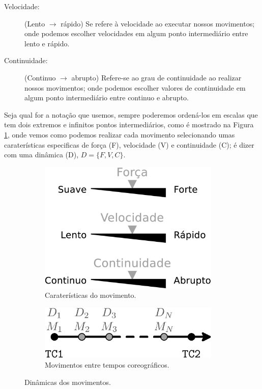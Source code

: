 \begin{description}
\item[Velocidade:] (Lento $\rightarrow$ rápido)
Se refere à velocidade ao executar nossos movimentos;
onde podemos escolher velocidades em algum ponto intermediário entre lento e rápido. 
\item[Continuidade:] (Continuo $\rightarrow$ abrupto)
Refere-se ao grau de continuidade ao realizar nossos movimentos;
onde podemos escolher valores de continuidade em algum ponto intermediário entre continuo e abrupto.
\end{description}
Seja qual for a notação que usemos, sempre poderemos ordená-los em escalas
que tem dois extremos e infinitos pontos intermediários,
como é mostrado na Figura \ref{fig:element:moviment},
onde vemos como podemos realizar cada movimento selecionando umas caraterísticas especificas de força (F), velocidade (V) e continuidade (C);
é dizer com uma dinâmica (D),  $D=\{F, V, C\}$.
\begin{figure}[!h]
\centering
    \begin{subfigure}[b]{0.45\textwidth}
    \centering
    \includegraphics[width=0.95\textwidth]{chapters/cap-musicalidade/dinamicas-elementos1.eps}
    \caption{Caraterísticas do movimento.}
    \label{fig:element:moviment}
    \end{subfigure}
    \hfill
    \begin{subfigure}[b]{0.5\textwidth}
    \centering
    \includegraphics[width=0.95\textwidth]{chapters/cap-musicalidade/dinamicas-elementos1b.eps}
    \caption{Movimentos entre tempos coreográficos.}
    \label{fig:coreografia:moviment}
    \end{subfigure}
\caption{Dinâmicas dos movimentos.}
\label{fig:geral:moviment}
\end{figure}
